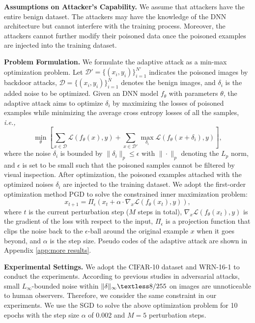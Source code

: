 \noindent \textbf{Assumptions on Attacker's Capability. }
We assume that attackers have the entire benign dataset. The attackers may have the knowledge of the DNN architecture but cannot interfere with the training process. Moreover, the attackers cannot further modify their poisoned data once the poisoned examples are injected into the training dataset.

\noindent \textbf{Problem Formulation.} We formulate the adaptive attack as a min-max optimization problem. Let $\mathcal{D}'=\{({x}_i, y_i)\}_{i=1}^{N'}$ indicates the poisoned images by backdoor attacks,  $\mathcal{D}=\{({x}_i, y_i)\}_{i=1}^{N}$ denotes the benign images, and $\delta_i$ is the added noise to be optimized. Given an DNN model $f_{\theta}$ with parameters ${\theta}$, the adaptive attack aims to optimize $\delta_i$ by maximizing the losses of poisoned examples while minimizing the average cross entropy losses of all the samples, \emph{i.e.,}
\begin{equation}
    \min_{\theta}\left[\sum_{x \in \mathcal{D}} \mathcal{L}(f_\theta(x),y)+\sum_{x \in \mathcal{D}'} \max_{\delta_i}\mathcal{L}(f_\theta(x+\delta_i),y)\right],
\end{equation}
where the noise $\delta_i$ is bounded by $\|\delta_i\|_p \le \epsilon$ with $\|\cdot\|_p$ denoting the $L_p$ norm, and $\epsilon$ is set to be small such that the poisoned samples cannot be filtered by visual inspection. After optimization,  the poisoned examples attached with the optimized noises $\delta_i$ are injected to the training dataset.
We adopt the first-order optimization method PGD \cite{madry2017towards} to solve the constrained inner maximization problem:
\begin{equation}
    x_{t+1} = \Pi_\epsilon(x_t + \alpha\cdot \nabla_x\mathcal{L}(f_{\theta}(x_t), y)),
\end{equation}
where $t$ is the current perturbation step ($M$ steps in total), $\nabla_x\mathcal{L}(f_{\theta}(x_t), y)$ is the gradient of the loss
with respect to the input, $\Pi_\epsilon$ is a projection function that clips the noise back to the $\epsilon$-ball around
the original example $x$ when it goes beyond, and $\alpha$ is the step size. Pseudo codes of the adaptive attack are shown in Appendix \ref{app:more results}.

\noindent \textbf{Experimental Settings.}
We adopt the CIFAR-10 dataset and WRN-16-1 to conduct the experiments. According to previous studies in adversarial attacks, small $L_\infty$-bounded noise within $\|\delta\|_\infty \textless 8/255$ on images are unnoticeable to human observers. Therefore, we consider the same constraint in our experiments.
We use the SGD to solve the above optimization problem for 10 epochs with the step size $\alpha$ of 0.002 and $M = 5$ perturbation steps.

